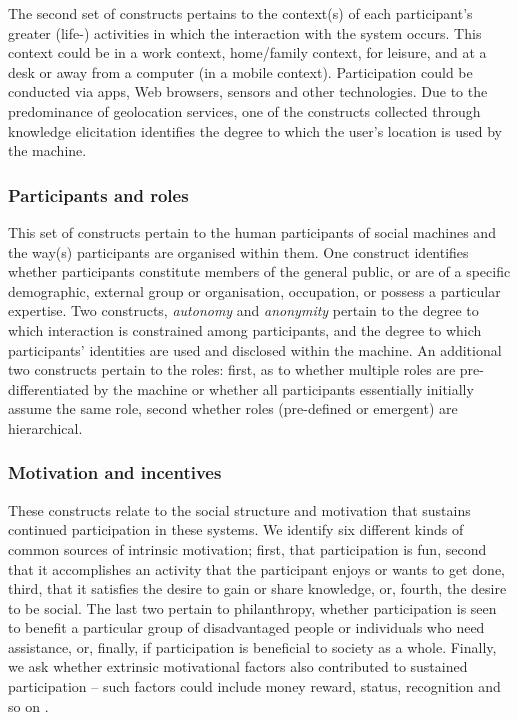 \documentclass{www13-companion-accepted}
\begin{document}
The second set of constructs pertains to the context(s) of each participant's greater (life-) activities in which the interaction with the system occurs. This context could be in a work context, home/family context, for leisure, and at a desk or away from a computer (in a mobile context). Participation could be conducted via apps, Web browsers, sensors and other technologies. Due to the predominance of geolocation services, one of the constructs collected through knowledge elicitation identifies the degree to which the user's location is used by the machine.

\subsubsection{Participants and roles}
This set of constructs pertain to the human participants of social machines and the way(s) participants are organised within them. One construct identifies whether participants constitute members of the general public, or are of a specific demographic, external group or organisation, occupation, or possess a particular expertise. Two constructs, \emph{autonomy} and \emph{anonymity} pertain to the degree to which interaction is constrained among participants, and the degree to which participants' identities are used and disclosed within the machine. An additional two constructs pertain to the roles: first, as to whether multiple roles are pre-differentiated by the machine or
whether all participants essentially initially assume the same role, second whether roles (pre-defined or emergent) are hierarchical.

\subsubsection{Motivation and incentives}
These constructs relate to the social structure and motivation that sustains
continued participation in these systems. We identify six different
kinds of common sources of intrinsic motivation; first, that
participation is fun, second that it accomplishes an activity that the
participant enjoys or wants to get done, third, that it satisfies the
desire to gain or share knowledge, or, fourth, the desire to be social. The
last two pertain to philanthropy, whether participation is seen to
benefit a particular group of disadvantaged people or individuals who
need assistance, or, finally, if participation is beneficial to
society as a whole. Finally, we ask whether extrinsic motivational
factors also contributed to sustained participation -- such factors
could include money reward, status, recognition and so on \cite{kuznetsov2006motivations,lakhani2003hackers,tagging}.
\end{document}
